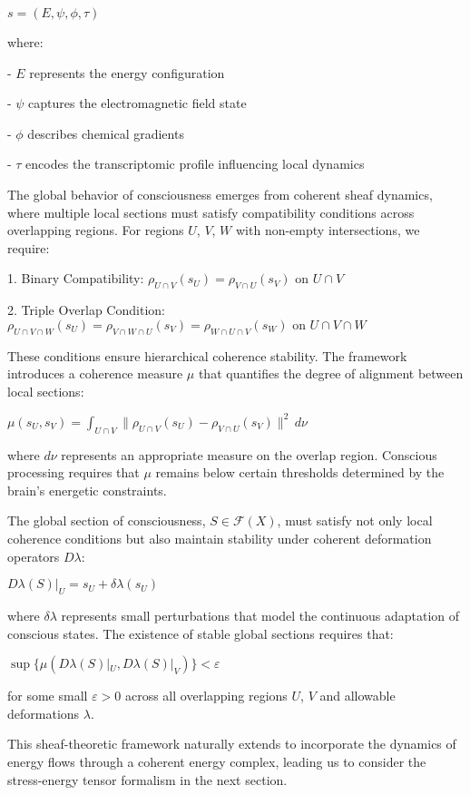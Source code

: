 $s = (E, \psi, \phi, \tau)$

where:

- $E$ represents the energy configuration

- $\psi$ captures the electromagnetic field state

- $\phi$ describes chemical gradients

- $\tau$ encodes the transcriptomic profile influencing local dynamics

The global behavior of consciousness emerges from coherent sheaf dynamics, where multiple local sections must satisfy compatibility conditions across overlapping regions. For regions $U$, $V$, $W$ with non-empty intersections, we require:

1. Binary Compatibility:
$\rho_{U \cap V}(s_U) = \rho_{V \cap U}(s_V) \text{ on } U \cap V$

2. Triple Overlap Condition:
$\rho_{U \cap V \cap W}(s_U) = \rho_{V \cap W \cap U}(s_V) = \rho_{W \cap U \cap V}(s_W) \text{ on } U \cap V \cap W$

These conditions ensure hierarchical coherence stability. The framework introduces a coherence measure $\mu$ that quantifies the degree of alignment between local sections:

$\mu(s_U, s_V) = \int_{U \cap V} \|\rho_{U \cap V}(s_U) - \rho_{V \cap U}(s_V)\|^2 \,d\nu$

where $d\nu$ represents an appropriate measure on the overlap region. Conscious processing requires that $\mu$ remains below certain thresholds determined by the brain's energetic constraints.

The global section of consciousness, $S \in \mathcal{F}(X)$, must satisfy not only local coherence conditions but also maintain stability under coherent deformation operators $D\lambda$:

$D\lambda(S)|_U = s_U + \delta\lambda(s_U)$

where $\delta\lambda$ represents small perturbations that model the continuous adaptation of conscious states. The existence of stable global sections requires that:

$\sup\{\mu(D\lambda(S)|_U, D\lambda(S)|_V)\} < \varepsilon$

for some small $\varepsilon > 0$ across all overlapping regions $U$, $V$ and allowable deformations $\lambda$.

This sheaf-theoretic framework naturally extends to incorporate the dynamics of energy flows through a coherent energy complex, leading us to consider the stress-energy tensor formalism in the next section.

